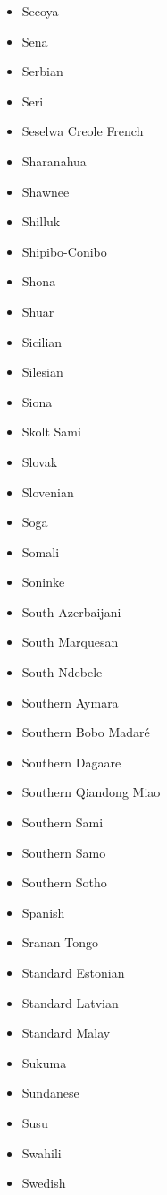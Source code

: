 \documentclass[paper=a4, 10pt]{scrbook}
\begin{document}
\begin{multicols}{3}
\begin{itemize}
        \item Secoya
        \item Sena
        \item Serbian
        \item Seri
        \item Seselwa Creole French
        \item Sharanahua
        \item Shawnee
        \item Shilluk
        \item Shipibo-Conibo
        \item Shona
        \item Shuar
        \item Sicilian
        \item Silesian
        \item Siona
        \item Skolt Sami
        \item Slovak
        \item Slovenian
        \item Soga
        \item Somali
        \item Soninke
        \item South Azerbaijani
        \item South Marquesan
        \item South Ndebele
        \item Southern Aymara
        \item Southern Bobo Madaré
        \item Southern Dagaare
        \item Southern Qiandong Miao
        \item Southern Sami
        \item Southern Samo
        \item Southern Sotho
        \item Spanish
        \item Sranan Tongo
        \item Standard Estonian
        \item Standard Latvian
        \item Standard Malay
        \item Sukuma
        \item Sundanese
        \item Susu
        \item Swahili
        \item Swedish

\end{itemize}
\end{multicols}
\end{document}
